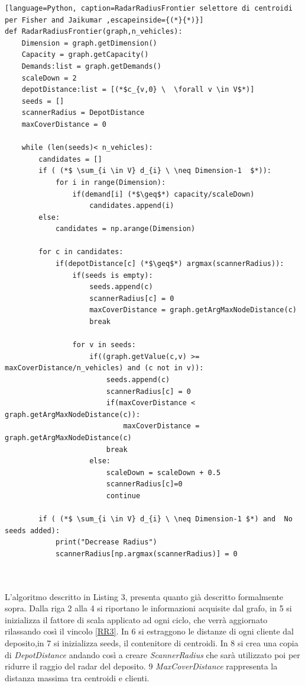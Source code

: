 \documentclass[]{article}
\begin{document}
\begin{lstlisting}[language=Python, caption=RadarRadiusFrontier selettore di centroidi per Fisher and Jaikumar ,escapeinside={(*}{*)}]
def RadarRadiusFrontier(graph,n_vehicles):
	Dimension = graph.getDimension()
	Capacity = graph.getCapacity()
	Demands:list = graph.getDemands()
	scaleDown = 2
	depotDistance:list = [(*$c_{v,0} \  \forall v \in V$*)]
	seeds = []
	scannerRadius = DepotDistance
	maxCoverDistance = 0

	while (len(seeds)< n_vehicles):
		candidates = []
		if ( (*$ \sum_{i \in V} d_{i} \ \neq Dimension-1  $*)):
			for i in range(Dimension):
				if(demand[i] (*$\geq$*) capacity/scaleDown)
					candidates.append(i)
		else:
			candidates = np.arange(Dimension)
		
		for c in candidates:
			if(depotDistance[c] (*$\geq$*) argmax(scannerRadius)):
				if(seeds is empty):
					seeds.append(c)
					scannerRadius[c] = 0
					maxCoverDistance = graph.getArgMaxNodeDistance(c)
					break
			
				for v in seeds:
			 		if((graph.getValue(c,v) >= maxCoverDistance/n_vehicles) and (c not in v)): 
			 			seeds.append(c)
			 			scannerRadius[c] = 0
			 			if(maxCoverDistance < graph.getArgMaxNodeDistance(c)):
			 				maxCoverDistance = graph.getArgMaxNodeDistance(c)
			 			break
			 		else:
			 			scaleDown = scaleDown + 0.5
			 			scannerRadius[c]=0
			 			continue
			 		
		if ( (*$ \sum_{i \in V} d_{i} \ \neq Dimension-1 $*) and  No seeds added):
			print("Decrease Radius")
			scannerRadius[np.argmax(scannerRadius)] = 0
			
				
\end{lstlisting}
L'algoritmo descritto in Listing 3, presenta quanto già descritto formalmente sopra. Dalla riga 2 alla 4 si riportano le informazioni acquisite dal grafo, in 5 si inizializza il fattore di scala applicato ad ogni ciclo, che verrà aggiornato rilassando così il vincolo \ref{RR3}. In 6 si estraggono le distanze di ogni cliente dal deposito,in 7 si inizializza seeds, il contenitore di centroidi. In 8 si crea una copia di \textit{DepotDistance} andando così a creare \textit{ScannerRadius} che sarà utilizzato poi per ridurre il raggio del radar del deposito. 9 \textit{MaxCoverDistance} rappresenta la distanza massima tra centroidi e clienti.
\end{document}
